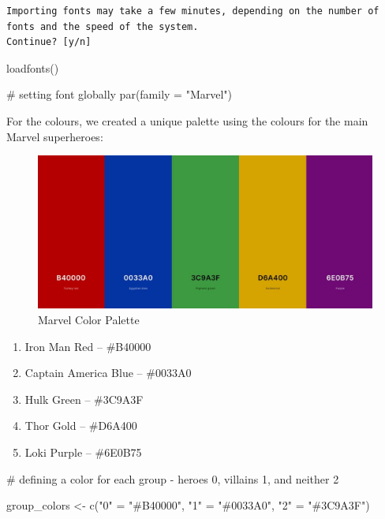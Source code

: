 \documentclass[
  letterpaper,
  DIV=11,
  numbers=noendperiod]{scrartcl}
\newenvironment{Shaded}{\begin{snugshade}}{\end{snugshade}}
\newcommand{\AttributeTok}[1]{\textcolor[rgb]{0.40,0.45,0.13}{#1}}
\newcommand{\CommentTok}[1]{\textcolor[rgb]{0.37,0.37,0.37}{#1}}
\newcommand{\FunctionTok}[1]{\textcolor[rgb]{0.28,0.35,0.67}{#1}}
\newcommand{\NormalTok}[1]{\textcolor[rgb]{0.00,0.23,0.31}{#1}}
\newcommand{\OtherTok}[1]{\textcolor[rgb]{0.00,0.23,0.31}{#1}}
\newcommand{\StringTok}[1]{\textcolor[rgb]{0.13,0.47,0.30}{#1}}
\begin{document}
\begin{verbatim}
Importing fonts may take a few minutes, depending on the number of fonts and the speed of the system.
Continue? [y/n] 
\end{verbatim}

\begin{Shaded}
\begin{Highlighting}[]
\FunctionTok{loadfonts}\NormalTok{() }

\CommentTok{\# setting font globally}
\FunctionTok{par}\NormalTok{(}\AttributeTok{family =} \StringTok{"Marvel"}\NormalTok{)}
\end{Highlighting}
\end{Shaded}

For the colours, we created a unique palette using the colours for the
main Marvel superheroes:

\begin{figure}[H]

{\centering \includegraphics{./marvel_palette.jpeg}

}

\caption{Marvel Color Palette}

\end{figure}%

\begin{enumerate}
\def\labelenumi{\arabic{enumi}.}
\item
  Iron Man Red -- \#B40000
\item
  Captain America Blue -- \#0033A0
\item
  Hulk Green -- \#3C9A3F
\item
  Thor Gold -- \#D6A400
\item
  Loki Purple -- \#6E0B75
\end{enumerate}

\begin{Shaded}
\begin{Highlighting}[]
\CommentTok{\# defining a color for each group {-} heroes \textquotesingle{}0\textquotesingle{}, villains \textquotesingle{}1\textquotesingle{}, and neither \textquotesingle{}2\textquotesingle{}}

\NormalTok{group\_colors }\OtherTok{\textless{}{-}} \FunctionTok{c}\NormalTok{(}\StringTok{"0"} \OtherTok{=} \StringTok{"\#B40000"}\NormalTok{, }\StringTok{"1"} \OtherTok{=} \StringTok{"\#0033A0"}\NormalTok{, }\StringTok{"2"} \OtherTok{=} \StringTok{"\#3C9A3F"}\NormalTok{)}
\end{Highlighting}
\end{Shaded}
\end{document}
